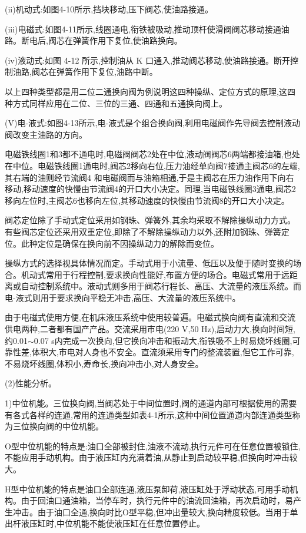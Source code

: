 

(ii)机动式:如图4-10所示,挡块移动,压下阀芯,使油路接通。

(iii)电磁式:如图4-11所示,线圈通电,衔铁被吸动,推动顶杆使滑阀阀芯移动接通油路。断电后,阀芯在弹簧作用下复位,使油路换向。

(iv)液动式:如图 4-12 所示,控制油从 K 口通入,推动阀芯移动,使油路接通。断开控制油路,阀芯在弹簧作用下复位,油路中断。

以上四种类型都是用二位二通换向阀为例说明这四种操纵、定位方式的原理,这四种方式同样应用在二位、三位的三通、四通和五通换向阀上。

(V)电-液式:如图4-13所示,电-液式是个组合换向阀,利用电磁阀作先导阀去控制液动阀改变主油路的方向。

电磁铁线圈1和3都不通电时,电磁阀阀芯2处在中位,液动阀阀芯6两端都接油箱,也处在中位。电磁铁线圈1通电时,阀芯2移向右位,压力油经单向阀7接通主阀芯6的左端,其右端的油则经节流阀4 和电磁阀而与油箱相通,于是主阀芯在压力油作用下向右移动,移动速度的快慢由节流阀4的开口大小决定。同理,当电磁铁线圈3通电,阀芯2移向左位时,主阀芯6也移向左位,其移动速度的快慢由节流阀8的开口大小决定。

阀芯定位除了手动式定位采用如钢珠、弹簧外,其余均采取不解除操纵动力方式。有些阀芯定位还采用双重定位,即除了不解除操纵动力以外,还附加钢珠、弹簧定位。此种定位是确保在换向前不因操纵动力的解除而变位。

操纵方式的选择视具体情况而定。手动式用于小流量、低压以及便于随时变换的场合。机动式常用于行程控制,要求换向性能好,布置方便的场合。电磁式常用于远距离或自动控制系统中。液动式则多用于阀芯行程长、高压、大流量的液压系统。而电-液式则用于要求换向平稳无冲击,高压、大流量的液压系统中。

由于电磁式使用方便,在机床液压系统中使用较普遍。电磁式换向阀有直流和交流供电两种,二者都有国产产品。交流采用市电(220 V,50 Hz),启动力大,换向时间短,约0.01$\sim$0.07 s内完成一次换向,但它换向冲击和振动大,衔铁吸不上时易烧坏线圈,可靠性差,体积大,市电对人身也不安全。直流须采用专门的整流装置,但它工作可靠,不易烧坏线圈,体积小,寿命长,换向冲击小,对人身安全。

(2)性能分析。

1)中位机能。三位换向阀,当阀芯处于中间位置时,阀的通道内部可根据使用的需要有各式各样的连通,常用的连通类型如表4-1所示,这种中间位置通道内部连通类型称为三位换向阀的中位机能。

 O型中位机能的特点是:油口全部被封住,油液不流动,执行元件可在任意位置被锁住,不能应用手动机构。由于液压缸内充满着油,从静止到启动较平稳,但换向时冲击较大。

 H型中位机能的特点是油口全部连通,液压泵卸荷,液压缸处于浮动状态,可用手动机构。由于回油口通油箱，当停车时，执行元件中的油流回油箱，再次启动时，易产生冲击。由于油口全通,换向时比O型平稳,但冲出量较大,换向精度较低。当用于单出杆液压缸时,中位机能不能使液压缸在任意位置停止。

